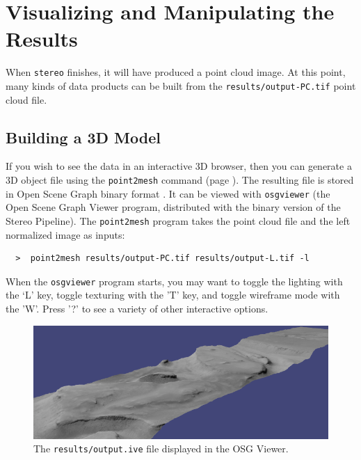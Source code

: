 \section{Visualizing and Manipulating the Results}
\label{visualising}

When \texttt{stereo} finishes, it will have produced a point cloud
image.  At this point, many kinds of data products can be built from
the \texttt{results/output-PC.tif} point cloud file.

\subsection{Building a 3D Model}

If you wish to see the data in an interactive 3D browser, then you can
generate a 3D object file using the \texttt{point2mesh} command (page
\pageref{point2mesh}). The resulting file is stored in Open Scene
Graph binary format \cite{OSG_website}.  It can be viewed with
\texttt{osgviewer} (the Open Scene Graph Viewer program, distributed
with the binary version of the Stereo Pipeline).  The
\texttt{point2mesh} program takes the point cloud file and the left
normalized image as inputs:

\begin{verbatim}
  >  point2mesh results/output-PC.tif results/output-L.tif -l
\end{verbatim}

\noindent
When the \texttt{osgviewer} program starts, you may want to toggle the
lighting with the `L' key, toggle texturing with the 'T' key, and
toggle wireframe mode with the 'W'.  Press '?' to see a variety of
other interactive options.

\begin{figure}[h!]
\begin{minipage}{5in}
\includegraphics[width=5in]{images/p19-osg.png}
\end{minipage}
\hfill
\begin{minipage}{1.7in}
\caption[P19 in OSG]{
    \label{p19-osg}
	The \texttt{results/output.ive} file displayed in the OSG
        Viewer.}
\end{minipage}
\end{figure}

